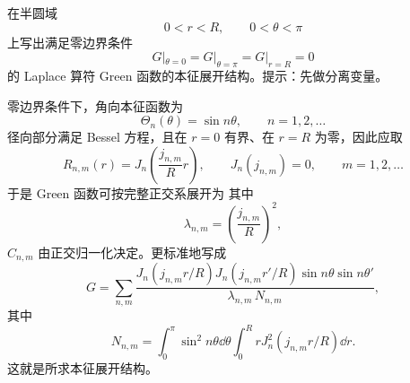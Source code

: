 \begin{question}
在半圆域
\[
0<r<R,\qquad 0<\theta<\pi
\]
上写出满足零边界条件
\[
G|_{\theta=0}=G|_{\theta=\pi}=G|_{r=R}=0
\]
的 Laplace 算符 Green 函数的本征展开结构。提示：先做分离变量。
\begin{solution}

零边界条件下，角向本征函数为
\[
\Theta_n(\theta)=\sin n\theta,\qquad n=1,2,\dots
\]
径向部分满足 Bessel 方程，且在 $r=0$ 有界、在 $r=R$ 为零，因此应取
\[
R_{n,m}(r)=J_n\!\left(\frac{j_{n,m}}{R}r\right),
\qquad J_n(j_{n,m})=0,
\qquad m=1,2,\dots
\]
于是 Green 函数可按完整正交系展开为
其中
\[
\lambda_{n,m}=\left(\frac{j_{n,m}}{R}\right)^2,
\]
$C_{n,m}$ 由正交归一化决定。更标准地写成
\[
G=\sum_{n,m}
\frac{J_n(j_{n,m}r/R)J_n(j_{n,m}r'/R)\sin n\theta\sin n\theta'}{
\lambda_{n,m}\,N_{n,m}},
\]
其中
\[
N_{n,m}=\int_0^{\pi}\!\sin^2 n\theta\dd{\theta}\int_0^R rJ_n^2(j_{n,m}r/R)\dd{r}.
\]
这就是所求本征展开结构。
\end{solution}
\end{question}


